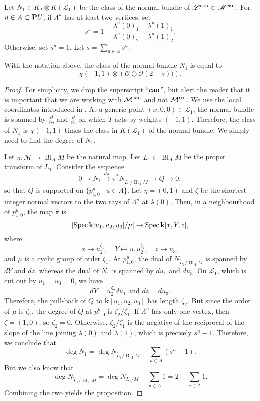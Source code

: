 \documentclass{amsart}
\renewcommand{\k}{\mathbf k}
\DeclareMathOperator{\Bl}{Bl}
\renewcommand{\O}{\mathcal O}
\begin{document}
Let \(N_1 \in K_T \otimes K(\mathscr L_1)\) be the class of the normal bundle of \(\mathscr L_1^{\rm can} \subset \mathscr M^{\rm can}\).
  For \(u \in A \subset \P U\), if \(\Lambda^u\) has at least two vertices, set
  \[ s^u = 1-\frac{\lambda^u(0)_1 - \lambda^u(1)_1}{\lambda^u(0)_2 - \lambda^u(1)_2}.\]
  Otherwise, set \(s^u = 1\).
  Let \(s = \sum_{u \in A} s^u\).
  \begin{proposition}\label{prop:normal}
    With the notation above, the class of the normal bundle \(N_1\) is equal to
    \[ \chi(-1,1) \otimes \left( \O \oplus \O(2-s))\right).\]
  \end{proposition}
  \begin{proof}
    For simplicity, we drop the superscript ``\(\rm can\)'', but alert the reader that it is important that we are working with \(\mathcal M^{\rm can}\) and not \(\mathcal M^{\rm res}\).
    We use the local coordinates introduced in .
    At a generic point \((x,0,0) \in \mathscr L_1\), the normal bundle is spanned by \(\frac{\partial}{\partial y}\) and \(\frac{\partial}{\partial z}\) on which \(T\) acts by weights \((-1,1)\).
    Therefore, the class of \(N_1\) is \(\chi(-1,1)\) times the class in \(K(\mathscr L_1)\) of the normal bundle.
    We simply need to find the degree of \(N_1\).
    
    Let \(\pi \colon \mathscr M \to \Bl_AM\) be the natural map.
    Let \(\widetilde L_1 \subset \Bl_AM\) be the proper transform of \(L_1\).
    Consider the sequence
    \[ 0 \to N_{1} \xrightarrow{d \pi} \pi^{*}N_{\widetilde L_1/\Bl_A M} \to Q \to 0,\]
    so that \(Q\) is supported on \(\{p_{1,0}^u \mid u \in A\}\).
    Let \(\eta = (0,1)\) and \(\zeta\) be the shortest integer normal vectors to the two rays of \(\Lambda^u\) at \(\lambda(0)\).
    Then, in a neighbourhood of \(p_{1,0}^u\), the map \(\pi\) is
    \[
   [\spec \k[u_1,u_2,u_3] / \mu] \to \spec \k[x,Y,z],
 \]
 where
 \[ x \mapsto u_2^{\zeta_1}, \quad Y \mapsto u_1u_2^{\zeta_2}, \quad z \mapsto u_3, \]
 and \(\mu\) is a cyclic group of order \(\zeta_1\).
 At \(p_{1,0}^u\), the dual of \(N_{\widetilde L_1/\Bl_A M}\) is spanned by \(dY\) and \(dz\), whereas the dual of \(N_{1}\) is spanned by \(du_1\) and \(du_3\).
 On \(\mathscr L_1\), which is cut out by \(u_1 = u_3 = 0\), we have
  \[ dY = u_2^{\zeta_2} du_1 \text{ and } dz = du_3.\]
  Therefore, the pull-back of \(Q\) to \(\k[u_1,u_2,u_3]\) has length \(\zeta_2\).
  But since the order of \(\mu\) is \(\zeta_1\), the degree of \(Q\) at \(p_{1,0}^u\) is \(\zeta_2/\zeta_1\).
  If \(\Lambda^u\) has only one vertex, then \(\zeta = (1,0)\), so \(\zeta_2 = 0\).
  Otherwise, \(\zeta_2/\zeta_1\) is the negative of the reciprocal of the slope of the line joining \(\lambda(0)\) and \(\lambda(1)\), which is precisely \(s^u-1\).
  Therefore, we conclude that
  \[ \deg N_{1} = \deg N_{\widetilde L_1 / \Bl_A M} - \sum_{u \in A} (s^u-1).\]
  But we also know that
  \[ \deg N_{\widetilde L_1 / \Bl_A M} = \deg N_{L_1 / M} - \sum_{u \in A} 1 = 2 - \sum_{u \in A} 1.\]
  Combining the two yields the proposition.
\end{proof}
\end{document}
